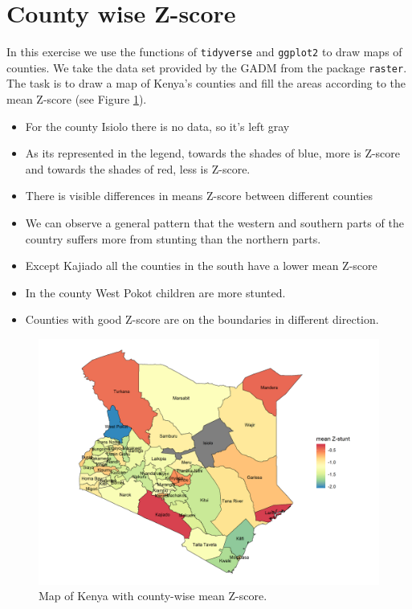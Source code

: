 \newpage
\section{County wise Z-score}
In this exercise we use the functions of \texttt{tidyverse} and \texttt{ggplot2} to draw maps of counties. We take the data set provided by the GADM from the package \texttt{raster}. 
The task is to draw a map of Kenya's counties and fill the areas according to the mean Z-score (see Figure \ref{fig:kenya}). 

\begin{itemize}
    \item For the county Isiolo there is no data, so it's left gray
    \item As its represented in the legend, towards the shades of blue, more is Z-score and towards the shades of red, less is Z-score.
    \item There is visible differences in means Z-score between different counties
    \item We can observe a general pattern that the western and southern parts of the country suffers more from stunting than the northern parts.
    \item Except Kajiado all the counties in the south have a lower mean Z-score
    \item In the county West Pokot children are more stunted.
    \item Counties with good Z-score are on the boundaries in different direction. 
\end{itemize}
\begin{figure}[h]
    \centering
	\includegraphics[scale=0.7]{ex1/Kenya.png}
	\caption{Map of Kenya with county-wise mean Z-score. }
	\label{fig:kenya}
\end{figure}
 